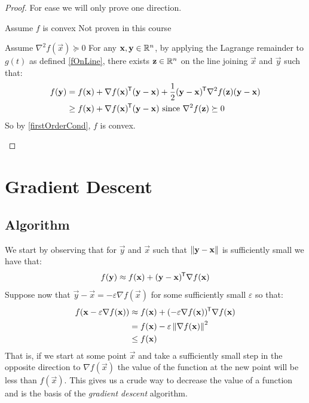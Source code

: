 \documentclass[../main.tex]{subfiles}
\begin{document}
\begin{proof}
  For ease we will only prove one direction.
  \begin{proofdirection}{Assume $f$ is convex}
    Not proven in this course
  \end{proofdirection}
  \begin{proofdirection}{Assume $\nabla^2 f(\vec{x}) \succeq 0$}
    For any $\mathbf{\bm{x}}, \mathbf{\bm{y}} \in \mathbb{R}^{n}$, by applying the Lagrange remainder to $g(t)$ as defined \cref{fOnLine}, there exists $\mathbf{\bm{z}} \in \mathbb{R}^{n}$ on the line joining $\vec{x}$ and $\vec{y}$ such that:
    \begin{align}
      f(\mathbf{\bm{y}}) &= f(\mathbf{\bm{x}}) + \nabla f(\mathbf{\bm{x}})^{{\mkern-1.5mu\mathsf{T}}} (\mathbf{\bm{y}} - \mathbf{\bm{x}}) + \frac{1}{2}(\mathbf{\bm{y}} - \mathbf{\bm{x}})^{{\mkern-1.5mu\mathsf{T}}} \nabla^2 f(\mathbf{\bm{z}}) (\mathbf{\bm{y}} - \mathbf{\bm{x}}) \label{lgMulti} \\
                 &\geq f(\mathbf{\bm{x}}) + \nabla f(\mathbf{\bm{x}})^{{\mkern-1.5mu\mathsf{T}}} (\mathbf{\bm{y}} - \mathbf{\bm{x}}) \text{ since $\nabla^2 f(\mathbf{\bm{z}}) \succeq 0$} \nonumber
    \end{align}
    So by \cref{firstOrderCond}, $f$ is convex.
  \end{proofdirection}
\end{proof}
\section{Gradient Descent}
\subsection{Algorithm}
We start by observing that for $\vec{y}$ and $\vec{x}$ such that $\left\lVert \mathbf{\bm{y}} - \mathbf{\bm{x}} \right\rVert$ is sufficiently small we have that:
\[
  f(\mathbf{\bm{y}}) \approx f(\mathbf{\bm{x}}) + (\mathbf{\bm{y}} - \mathbf{\bm{x}})^{{\mkern-1.5mu\mathsf{T}}}\nabla f(\mathbf{\bm{x}})
\]
Suppose now that $\vec{y} - \vec{x} = -\varepsilon\nabla f(\vec{x})$ for some sufficiently small $\varepsilon$ so that:
\begin{align*}
  f(\mathbf{\bm{x}} - \varepsilon \nabla f(\mathbf{\bm{x}})) &\approx f(\mathbf{\bm{x}}) + (-\varepsilon \nabla f(\mathbf{\bm{x}}))^{{\mkern-1.5mu\mathsf{T}}} \nabla f(\mathbf{\bm{x}}) \\
                                             &= f(\mathbf{\bm{x}}) - \varepsilon \left\lVert \nabla f(\mathbf{\bm{x}}) \right\rVert^2 \\
                                             &\leq f(\mathbf{\bm{x}})
\end{align*}
That is, if we start at some point $\vec{x}$ and take a sufficiently small step in the opposite direction to $\nabla f(\vec{x})$ the value of the function at the new point will be less than $f(\vec{x})$.
This gives us a crude way to decrease the value of a function and is the basis of the \textit{gradient descent} algorithm.
\end{document}
